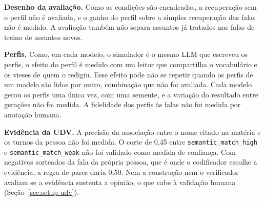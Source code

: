 \textbf{Desenho da avaliação.} Como as condições são encadeadas, a recuperação sem o perfil não é
avaliada, e o ganho do perfil sobre a simples recuperação das falas não é medido. A avaliação
também não separa assuntos já tratados nas falas de treino de assuntos novos.

\textbf{Perfis.} Como, em cada modelo, o simulador é o mesmo LLM que escreveu os perfis, o efeito do
perfil é medido com um leitor que compartilha o vocabulário e os vieses de quem o redigiu. Esse
efeito pode não se repetir quando os perfis de um modelo são lidos por outro, combinação que não foi
avaliada. Cada modelo gerou os perfis uma única vez, com uma semente, e a variação do resultado entre
gerações não foi medida. A fidelidade dos perfis às falas não foi medida por anotação humana.

\textbf{Evidência da UDV.} A precisão da associação entre o nome citado na matéria e os turnos da
pessoa não foi medida. O corte de 0,45 entre \texttt{semantic\_match\_high} e
\texttt{semantic\_match\_weak} não foi validado como medida de confiança. Com negativos sorteados da
fala da própria pessoa, que é onde o codificador escolhe a evidência, a regra de pares daria 0,50. Nem
a construção nem o
verificador avaliam se a evidência sustenta a opinião, o que cabe à validação humana
(Seção~\ref{sec:setup-udv}).
